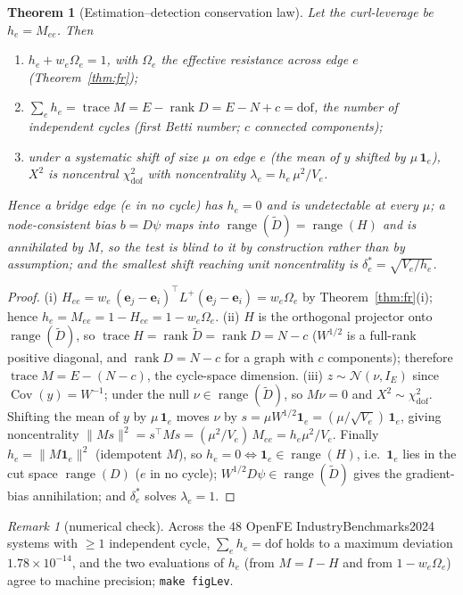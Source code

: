 \documentclass[11pt]{article}
\theoremstyle{plain}
\newtheorem{theorem}{Theorem}
\theoremstyle{remark}
\newtheorem{remark}{Remark}
\begin{document}
\begin{theorem}[Estimation--detection conservation law]\label{thm:cons}
Let the \emph{curl-leverage} be $h_e=M_{ee}$. Then
\begin{enumerate}[label=(\roman*),leftmargin=2.2em,itemsep=1pt]
\item $h_e+w_e\Omega_e=1$, with $\Omega_e$ the effective resistance across edge $e$ (Theorem~\ref{thm:fr});
\item $\sum_e h_e=\operatorname{trace}M=E-\operatorname{rank}D=E-N+c=\mathrm{dof}$, the number of
independent cycles (first Betti number; $c$ connected components);
\item under a systematic shift of size $\mu$ on edge $e$ (the mean of $y$ shifted by $\mu\,\mathbf 1_e$),
$X^2$ is noncentral $\chi^2_{\mathrm{dof}}$ with noncentrality $\lambda_e=h_e\,\mu^2/V_e$.
\end{enumerate}
Hence a bridge edge ($e$ in no cycle) has $h_e=0$ and is undetectable at every $\mu$; a node-consistent
bias $b=D\psi$ maps into $\operatorname{range}(\tilde D)=\operatorname{range}(H)$ and is annihilated by
$M$, so the test is blind to it \emph{by construction} rather than by assumption; and the smallest shift
reaching unit noncentrality is $\delta^\ast_e=\sqrt{V_e/h_e}$.
\end{theorem}
\begin{proof}
(i) $H_{ee}=w_e\,(\mathbf e_j-\mathbf e_i)^\top L^{+}(\mathbf e_j-\mathbf e_i)=w_e\Omega_e$ by
Theorem~\ref{thm:fr}(i); hence $h_e=M_{ee}=1-H_{ee}=1-w_e\Omega_e$. (ii) $H$ is the orthogonal projector
onto $\operatorname{range}(\tilde D)$, so $\operatorname{trace}H=\operatorname{rank}\tilde D
=\operatorname{rank}D=N-c$ ($W^{1/2}$ is a full-rank positive diagonal, and $\operatorname{rank}D=N-c$
for a graph with $c$ components); therefore $\operatorname{trace}M=E-(N-c)$, the cycle-space dimension.
(iii) $z\sim\mathcal N(\nu,I_E)$ since $\operatorname{Cov}(y)=W^{-1}$; under the null
$\nu\in\operatorname{range}(\tilde D)$, so $M\nu=0$ and $X^2\sim\chi^2_{\mathrm{dof}}$. Shifting the mean
of $y$ by $\mu\,\mathbf 1_e$ moves $\nu$ by $s=\mu W^{1/2}\mathbf 1_e=(\mu/\sqrt{V_e})\,\mathbf 1_e$,
giving noncentrality $\|Ms\|^2=s^\top M s=(\mu^2/V_e)\,M_{ee}=h_e\mu^2/V_e$. Finally $h_e=\|M\mathbf 1_e\|^2$
(idempotent $M$), so $h_e=0\Leftrightarrow\mathbf 1_e\in\operatorname{range}(H)$, i.e.\ $\mathbf 1_e$ lies
in the cut space $\operatorname{range}(D)$ ($e$ in no cycle); $W^{1/2}D\psi\in\operatorname{range}(\tilde D)$
gives the gradient-bias annihilation; and $\delta^\ast_e$ solves $\lambda_e=1$.
\end{proof}
\begin{remark}[numerical check]
Across the $48$ OpenFE IndustryBenchmarks2024 systems with $\ge1$ independent cycle,
$\sum_e h_e=\mathrm{dof}$ holds to a maximum deviation $1.78\times10^{-14}$, and the two evaluations of
$h_e$ (from $M=I-H$ and from $1-w_e\Omega_e$) agree to machine precision; \texttt{make figLev}.
\end{remark}
\end{document}
